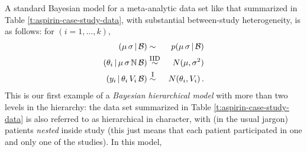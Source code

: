 \documentclass[12pt]{article}
\newcommand{\given}{\, | \,}
\begin{document}
A standard Bayesian model for a meta-analytic data set like that summarized in Table \ref{t:aspirin-case-study-data}, with substantial between-study heterogeneity, is as follows: for $( i = 1, \dots, k )$,
\begin{eqnarray} \label{e:random-effects-model}
( \mu \, \sigma \given \mathcal{ B } ) & \sim & p ( \mu \, \sigma \given \mathcal{ B } ) \nonumber \\
( \theta_i \given \mu \, \sigma \, \mathbb{ N } \, \mathcal{ B } ) & \stackrel{  \textrm{\footnotesize IID} }{ \sim } & N ( \mu, \sigma^2 ) \nonumber \\
( y_i \given \theta_i \, V_i \, \mathcal{ B } ) & \stackrel{ \textrm{\footnotesize I} }{ \sim } & N ( \theta_i, V_i ) \, .
\end{eqnarray}
This is our first example of a \textit{Bayesian hierarchical model} with more than two levels in the hierarchy: the data set summarized in Table \ref{t:aspirin-case-study-data} is also referred to as hierarchical in character, with (in the usual jargon) patients \textit{nested} inside study (this just means that each patient participated in one and only one of the studies). In this model, 
\end{document}
